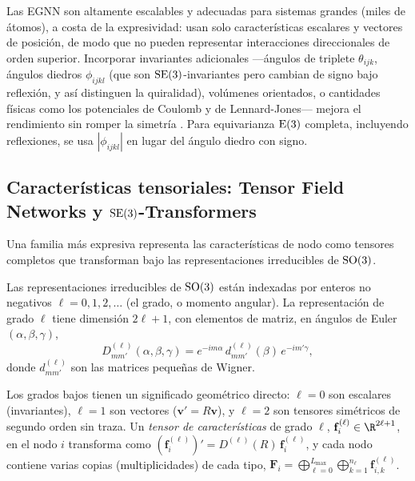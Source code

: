 Las EGNN son altamente escalables y adecuadas para sistemas grandes (miles de
\'atomos), a costa de la expresividad: usan solo caracter\'isticas escalares y
vectores de posici\'on, de modo que no pueden representar interacciones
direccionales de orden superior. Incorporar invariantes adicionales ---\'angulos
de triplete $\theta_{ijk}$, \'angulos diedros $\phi_{ijkl}$ (que son
$\operatorname{SE}(3)$-invariantes pero cambian de signo bajo reflexi\'on, y as\'i distinguen
la quiralidad), vol\'umenes orientados, o cantidades f\'isicas como los
potenciales de Coulomb y de Lennard-Jones--- mejora el rendimiento sin romper la
simetr\'ia \citep{tholke2022geometric}. Para equivarianza $\operatorname{E}(3)$ completa,
incluyendo reflexiones, se usa $|\phi_{ijkl}|$ en lugar del \'angulo diedro con
signo.

\subsection{Caracter\'isticas tensoriales: Tensor Field Networks y $\operatorname{SE}(3)$-Transformers}
\label{sec:groups:tfn}

Una familia m\'as expresiva representa las caracter\'isticas de nodo como
tensores completos que transforman bajo las representaciones irreducibles de
$\operatorname{SO}(3)$.

\begin{definition}
\label{def:groups:so3-irreps}
Las representaciones irreducibles de $\operatorname{SO}(3)$ est\'an indexadas por enteros no
negativos $\ell = 0, 1, 2, \dots$ (el grado, o momento angular). La
representaci\'on de grado $\ell$ tiene dimensi\'on $2\ell + 1$, con elementos de
matriz, en \'angulos de Euler $(\alpha, \beta, \gamma)$,
\begin{equation}
  D^{(\ell)}_{mm'}(\alpha, \beta, \gamma)
  = e^{-im\alpha}\, d^{(\ell)}_{mm'}(\beta)\, e^{-im'\gamma},
\end{equation}
donde $d^{(\ell)}_{mm'}$ son las matrices peque\~nas de Wigner.
\end{definition}

Los grados bajos tienen un significado geom\'etrico directo: $\ell = 0$ son
escalares (invariantes), $\ell = 1$ son vectores ($\mathbf{v}' = R\mathbf{v}$), y
$\ell = 2$ son tensores sim\'etricos de segundo orden sin traza. Un \emph{tensor
de caracter\'isticas} de grado $\ell$, $\mathbf{f}_i^{(\ell)} \in \R^{2\ell+1}$,
en el nodo $i$ transforma como $(\mathbf{f}_i^{(\ell)})' = D^{(\ell)}(R)\,
\mathbf{f}_i^{(\ell)}$, y cada nodo contiene varias copias (multiplicidades) de
cada tipo, $\mathbf{F}_i = \bigoplus_{\ell=0}^{L_{\max}} \bigoplus_{k=1}^{n_\ell}
\mathbf{f}_{i,k}^{(\ell)}$.

